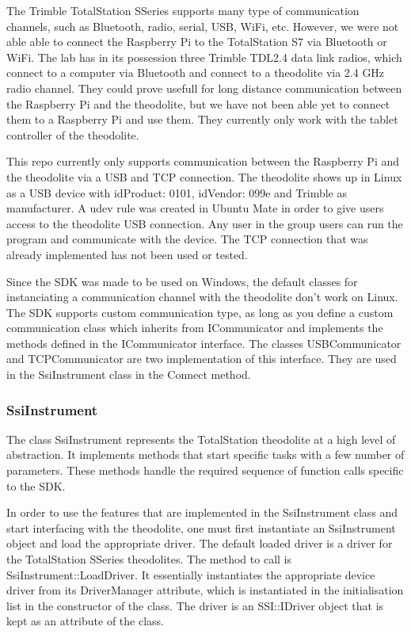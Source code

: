 \documentclass[10pt,letterpaper,oneside]{article}
\begin{document}
The Trimble TotalStation SSeries supports many type of communication channels, such as Bluetooth, radio, serial, USB, WiFi, etc. 
However, we were not able able to connect the Raspberry Pi to the TotalStation S7 via Bluetooth or WiFi. 
The lab has in its possession three Trimble TDL2.4 data link radios, which connect to a computer via Bluetooth and connect to a theodolite via 2.4 GHz radio channel. 
They could prove usefull for long distance communication between the Raspberry Pi and the theodolite, but we have not been able yet to connect them to a Raspberry Pi and use them. 
They currently only work with the tablet controller of the theodolite.

This repo currently only supports communication between the Raspberry Pi and the theodolite via a USB and TCP connection. 
The theodolite shows up in Linux as a USB device with idProduct: 0101, idVendor: 099e and Trimble as manufacturer. 
A udev rule was created in Ubuntu Mate in order to give users access to the theodolite USB connection.
Any user in the group users can run the program and communicate with the device. 
The TCP connection that was already implemented has not been used or tested.

Since the SDK was made to be used on Windows, the default classes for instanciating a communication channel with the theodolite don't work on Linux. 
The SDK supports custom communication type, as long as you define a custom communication class which inherits from ICommunicator and implements the methods defined in the ICommunicator interface.
The classes USBCommunicator and TCPCommunicator are two implementation of this interface. They are used in the SsiInstrument class in the Connect method.

\subsubsection{SsiInstrument}

The class SsiInstrument represents the TotalStation theodolite at a high level of abstraction. 
It implements methods that start specific tasks with a few number of parameters. 
These methods handle the required sequence of function calls specific to the SDK.

In order to use the features that are implemented in the SsiInstrument class and start interfacing with the theodolite, one must first instantiate an SsiInstrument object and load the appropriate driver. 
The default loaded driver is a driver for the TotalStation SSeries theodolites. 
The method to call is SsiInstrument::LoadDriver. 
It essentially instantiates the appropriate device driver from its DriverManager attribute, which is instantiated in the initialisation list in the constructor of the class. 
The driver is an SSI::IDriver object that is kept as an attribute of the class.
\end{document}
